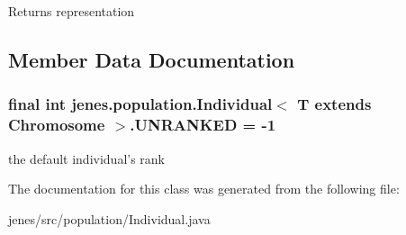 \begin{DoxyReturn}{Returns}
representation 
\end{DoxyReturn}


\subsection{Member Data Documentation}
\hypertarget{classjenes_1_1population_1_1_individual_3_01_t_01extends_01_chromosome_01_4_a6f913202241aa5f7255e482179175f62}{
\subsubsection[{U\-N\-R\-A\-N\-K\-E\-D}]{\setlength{\rightskip}{0pt plus 5cm}final int jenes.\-population.\-Individual$<$ T extends Chromosome $>$.U\-N\-R\-A\-N\-K\-E\-D = -\/1\hspace{0.3cm}{\ttfamily [static]}}}\label{classjenes_1_1population_1_1_individual_3_01_t_01extends_01_chromosome_01_4_a6f913202241aa5f7255e482179175f62}
the default individual's rank 

The documentation for this class was generated from the following file\-:\begin{DoxyCompactItemize}
\item 
jenes/src/population/Individual.\-java\end{DoxyCompactItemize}
